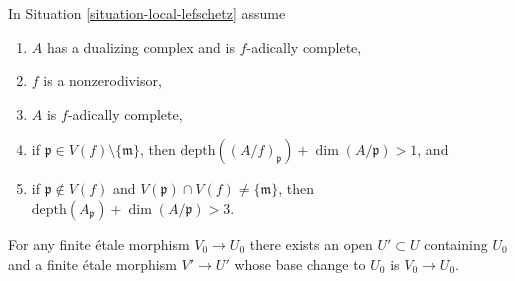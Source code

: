 \begin{lemma}
\label{lemma-essentially-surjective-general-better}
In Situation \ref{situation-local-lefschetz} assume
\begin{enumerate}
\item $A$ has a dualizing complex and is $f$-adically complete,
\item $f$ is a nonzerodivisor,
\item $A$ is $f$-adically complete,
\item if $\mathfrak p \in V(f) \setminus \{\mathfrak m\}$, then
$\text{depth}((A/f)_\mathfrak p) + \dim(A/\mathfrak p) > 1$, and
\item if $\mathfrak p \not \in V(f)$ and
$V(\mathfrak p) \cap V(f) \not = \{\mathfrak m\}$, then
$\text{depth}(A_\mathfrak p) + \dim(A/\mathfrak p) > 3$.
\end{enumerate}
For any finite \'etale morphism $V_0 \to U_0$ there exists an open
$U' \subset U$ containing $U_0$ and a finite \'etale morphism
$V' \to U'$ whose base change to $U_0$ is $V_0 \to U_0$.
\end{lemma}


